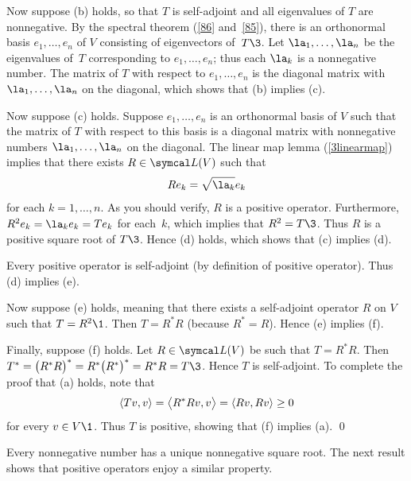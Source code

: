 {
\setlength{\abovedisplayskip}{4bp} %
\setlength{\belowdisplayskip}{4bp} %

Now suppose (b) holds, so that $T$ is self-adjoint and all eigenvalues
of $T$ are nonnegative. By the spectral theorem (\ref{86} and~\ref{85}), there is an orthonormal basis $e_1, \dots, e_n$ of $V$
consisting of eigenvectors of~$T\3$.  Let $\la_1, \dots, \la_n$ be the
eigenvalues of~$T$ corresponding to $e_1, \dots, e_n$; thus each
$\la_k$ is a nonnegative number. The matrix of $T$ with respect to $e_1, \ldots, e_n$ is the diagonal matrix with $\la_1, \ldots, \la_n$ on the diagonal, which shows that (b) implies (c).

Now suppose (c) holds. Suppose $e_1, \ldots, e_n$ is an orthonormal basis of $V$ such that the matrix of $T$ with respect to this basis is a diagonal matrix with nonnegative numbers $\la_1, \ldots, \la_n$ on the diagonal. The linear map lemma (\ref{3linearmap}) implies that there exists $R \in \L(V)$ such that
\[
Re_k = \sqrt{\la_k} e_k
\]
for each $k = 1, \dots, n$. As you should verify, $R$ is a positive operator.
Furthermore, $R^2 e_k = \la_k e_k = Te_k$ for each~$k$, which implies
that $R^2 = T\3$.  Thus $R$ is a positive square root of $T\3$. Hence (d) holds, which shows that (c) implies (d).

Every positive operator is self-adjoint (by definition of positive operator). Thus (d) implies (e).
}

Now suppose (e) holds, meaning that there exists a self-adjoint operator $R$
on $V$ such that $T = R^2\1$.  Then $T = R^* R$ \big(because $R^* = R$\big). Hence (e) implies (f).

Finally, suppose (f) holds.  Let $R \in \L(V)$ be such that $T = R^*R$.  Then
$T^* = \paren[\big]{R^*R}^* = R^*\paren[\big]{R^*}^* = R^*R = T\3$. Hence $T$ is self-adjoint.  To
complete the proof that (a) holds, note that
\[
\ip{Tv, v} = \ip[\big]{R^*Rv, v} = \ip{Rv, Rv} \ge 0
\]
for every $v \in V\1$.  Thus $T$ is positive, showing that (f) implies (a).
\qed

\pagebreak[3]

Every nonnegative number has a unique nonnegative square root.  The next
result shows that positive operators enjoy a similar property.



